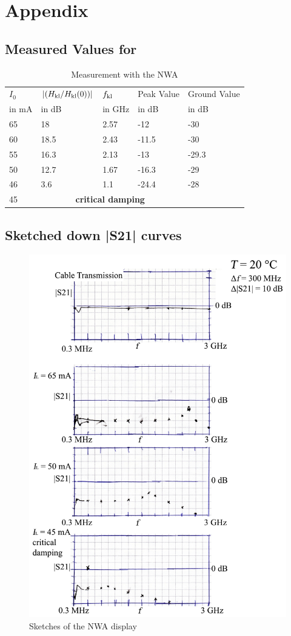 \appendix
\chapter{Appendix}
\section{Measured Values for }

\begin{table}[h]
 \caption{Measurement with the NWA}
\begin{center}

\begin{tabular}{lllll}

\toprule
$I_0$&$\left|(H_{\mathrm{kl}}/H_{\mathrm{kl}}(0))\right|$&$f_{\mathrm{kl}}$&Peak Value&Ground Value\\
in mA& in dB&in GHz&in dB& in dB\\
\midrule
65&18&2.57&-12&-30\\
60&18.5&2.43&-11.5&-30\\
55&16.3&2.13&-13&-29.3\\
50&12.7&1.67&-16.3&-29\\
46&3.6&1.1&-24.4&-28\\
45&\multicolumn{3}{c}{\textbf{critical damping}}&\\
\bottomrule
\end{tabular}
\end{center}
\label{tab:measurement}
\end{table}
\newpage

\section{Sketched down |S21| curves}
\label{app:s21}
\begin{figure}[hb]
\centering
\includegraphics[width=0.85\columnwidth]{Grafiken/s21.pdf}%
\caption{Sketches of the NWA display}%
\label{}%
\end{figure}